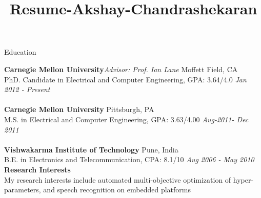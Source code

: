 \documentclass{resume} %
\title{Resume-Akshay-Chandrashekaran}
\begin{document}
\vspace{-2em}

\begin{rSection}{Education}

{\bf Carnegie Mellon University}{\em Advisor: Prof. Ian Lane} \hfill {Moffett Field, CA}  \\
PhD. Candidate in Electrical and Computer Engineering, GPA: 3.64/4.0 \hfill {\em Jan 2012 - Present} \\
\\
{\bf Carnegie Mellon University} \hfill {Pittsburgh, PA} \\
M.S. in Electrical and Computer Engineering, GPA: 3.63/4.00 \hfill {\em Aug-2011- Dec 2011} \\
\\
{\bf Vishwakarma Institute of Technology} \hfill {Pune, India} \\
B.E. in Electronics and Telecommunication, CPA: 8.1/10  \hfill {\em Aug 2006 - May 2010}\\ 

{\bf Research Interests}{}\\
{My research interests include automated multi-objective optimization of hyper-parameters, and speech recognition on embedded platforms}
\end{rSection}


\end{document}
